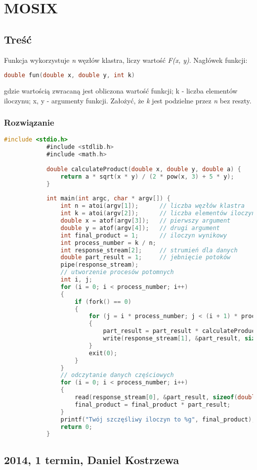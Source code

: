 \newpage
\section{MOSIX}
	\subsection{Treść}
		Funkcja wykorzystuje \textit{n} węzłów klastra, liczy wartość \textit{F(x, y)}. Nagłówek funkcji:
		\begin{lstlisting}[language=C]
			double fun(double x, double y, int k)
		\end{lstlisting}
		gdzie wartością zwracaną jest obliczona wartość funkcji; k - liczba elementów iloczynu; x, y - argumenty funkcji. Założyć, że \textit{k} jest podzielne przez \textit{n} bez reszty.
	\subsubsection{Rozwiązanie}
		\begin{lstlisting}[language=C]
			#include <stdio.h>
			#include <stdlib.h>
			#include <math.h>
			
			double calculateProduct(double x, double y, double a) {
				return a * sqrt(x * y) / (2 * pow(x, 3) + 5 * y);
			}
			
			int main(int argc, char * argv[]) {
				int n = atoi(argv[1]);		// liczba węzłów klastra
				int k = atoi(argv[2]);		// liczba elementów iloczynu
				double x = atof(argv[3]);	// pierwszy argument
				double y = atof(argv[4]);	// drugi argument
				int final_product = 1;		// iloczyn wynikowy
				int process_number = k / n;
				int response_stream[2];		// strumień dla danych
				double part_result = 1;		// jebnięcie potoków
				pipe(response_stream);
				// utworzenie procesów potomnych
				int i, j;
				for (i = 0; i < process_number; i++)
				{
					if (fork() == 0)
					{
						for (j = i * process_number; j < (i + 1) * process_number; j++)
						{
							part_result = part_result * calculateProduct(x, y, j);
							write(response_stream[1], &part_result, sizeof(double));
						}
						exit(0);
					}
				}
				// odczytanie danych częściowych
				for (i = 0; i < process_number; i++)
				{
					read(response_stream[0], &part_result, sizeof(double));
					final_product = final_product * part_result;
				}
				printf("Twój szczęśliwy iloczyn to %g", final_product);
				return 0;
			}
		\end{lstlisting}
	\subsection{2014, 1 termin, Daniel Kostrzewa}
